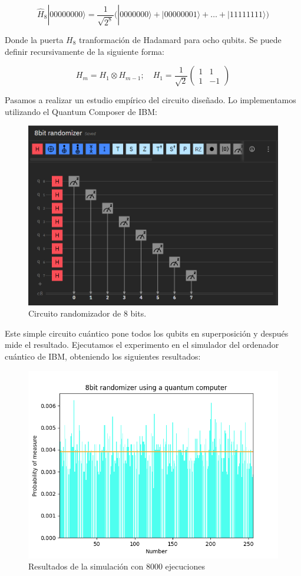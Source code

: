 \documentclass[11pt]{article}
\newcommand{\ra}{\rangle}
\begin{document}
\[
	\hat H_8|00000000\ra = \frac{1}{\sqrt{2^8}}\big(|0000000\ra + |00000001\ra + \ldots + |11111111\ra\big)
\]

Donde la puerta $H_8$ tranformación de Hadamard para ocho qubits. Se puede definir recursivamente de la siguiente forma:

\[
	H_m = H_1 \otimes H_{m-1}; \quad H_1 = \frac{1}{\sqrt 2}
	\begin{pmatrix}
		1 & 1 \\
		1 & -1 
	\end{pmatrix}
\]

Pasamos a realizar un estudio empírico del circuito diseñado. Lo implementamos utilizando el Quantum Composer de IBM:

\begin{figure}[H]
	\centering
	\includegraphics[scale=0.7]{figures/8bits_rand.png}
	\caption{Circuito randomizador de 8 bits.}
\end{figure}

Este simple circuito cuántico pone todos los qubits en superposición y después mide el resultado. Ejecutamos el experimento en el simulador del ordenador cuántico de IBM, obteniendo los siguientes resultados:

\begin{figure}[H]
	\centering
	\includegraphics[scale=0.7]{figures/barplot_quantum.png}
	\caption{Resultados de la simulación con 8000 ejecuciones}
\end{figure}
\end{document}
